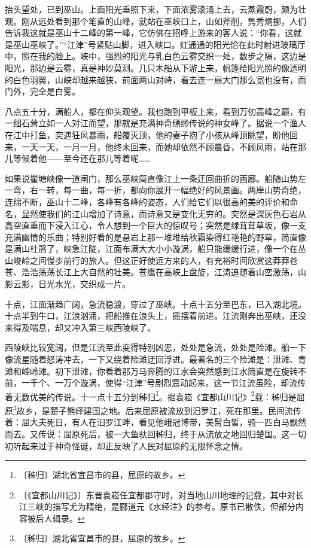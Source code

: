 \documentclass[12pt,UTF-8,openany]{ctexbook}
\begin{document}
\begin{normalsize}
    抬头望处，已到巫山。上面阳光垂照下来，下面浓雾滚涌上去，云蒸霞蔚，颇为壮观。刚从远处看到那个笔直的山峰，就站在巫峡口上，山如斧削，隽秀炯挪，人们告诉我这就是巫山十二峰的第一峰，它仿佛在招呼上游来的客人说：“你看，这就是巫山巫峡了。”“江津”号紧贴山脚，进入峡口。红通通的阳光恰在此时射进玻璃厅中，照在我的脸上。峡中，强烈的阳光与乳白色云雾交织一处，数步之隔，这边是阳光，那边是云雾，真是神妙莫测。几只木船从下游上来，帆篷给阳光照的像透明的白色羽翼，山峡却越来越狭，前面两山对峙，看去连一扇大门那么宽也没有，而门外，完全是白雾。
    
    八点五十分，满船人，都在仰头观望。我也跑到甲板上来，看到万仞高峰之巅，有一细石耸立如一人对江而望，那就是充满神奇缥缈传说的神女峰了。据说一个渔人在江中打鱼，突遇狂风暴雨，船覆灭顶，他的妻子抱了小孩从峰顶眺望，盼他回来，一天一天，一月一月，他终未回来，而她却依然不顾晨昏，不顾风雨，站在那儿等候着他——至今还在那儿等着呢……
    
    如果说瞿塘峡像一道闸门，那么巫峡简直像江上一条迂回曲折的画廊。船随山势左一弯，右一转，每一曲，每一折，都向你展开一幅绝好的风景画。两岸山势奇绝，连绵不断，巫山十二峰，各峰有各峰的姿态，人们给它们以很高的美的评价和命名，显然使我们的江山增加了诗意，而诗意又是变化无穷的。突然是深灰色石岩从高空直垂而下浸入江心，令人想到一个巨大的惊叹号；突然是绿茸茸草坂，像一支充满幽情的乐曲；特别好看的是悬岩上那一堆堆给秋霜染得红艳艳的野草，简直像是满山杜鹃了，峡急江陡，江面布满大大小小漩涡，船只能缓缓行进，像一个在丛山峻岭之间慢步前行的旅人。但这正好使远方来的人，有充裕时间欣赏这莽莽苍苍、浩浩荡荡长江上大自然的壮美。苍鹰在高峡上盘旋，江涛追随着山峦激荡，山影云影，日光水光，交织成一片。
    
    十点，江面渐趋广阔，急流稳渡，穿过了巫峡。十点十五分至巴东，已入湖北境。十点半到牛口，江浪汹涌，把船推在浪头上，摇摆着前进。江流刚奔出巫峡，还没来得及喘息，却又冲入第三峡西陵峡了。
    
    西陵峡比较宽阔，但是江流至此变得特别凶恶，处处是急流，处处是险滩。船一下像流星随着怒涛冲去，一下又绕着险滩迂回浮进。最著名的三个险滩是：泄滩、青滩和崆岭滩。初下泄滩，你看着那万马奔腾的江水会突然感到江水简直是在旋转不前，一千个、一万个漩涡，使得“江津”号剧烈震动起来。这一节江流虽险，却流传着无数优美的传说。十一点十五分到秭归\footnote{〔秭归〕湖北省宜昌市的县，屈原的故乡。}。据袁崧《宜都山川记》\footnote{〔《宜都山川记》〕东晋袁崧任宜都郡守时，对当地山川地理的记载，其中对长江三峡的描写尤为精绝，是郦道元《水经注》的参考。原书已散佚，但部分内容被后人辑录。}载：秭归是屈原\footnote{〔秭归〕湖北省宜昌市的县，屈原的故乡。}故乡，是楚子熊绎建国之地。后来屈原被流放到汨罗江，死在那里。民间流传着：屈大夫死日，有人在汨罗江畔，看见他峨冠博带，美髯白皙，骑一匹白马飘然而去。又传说：屈原死后，被一大鱼驮回秭归，终于从流放之地回归楚国。这一切初听起来过于神奇怪诞，却正反映了人民对屈原的无限怀念之情。
    

\end{normalsize}
\end{document}
